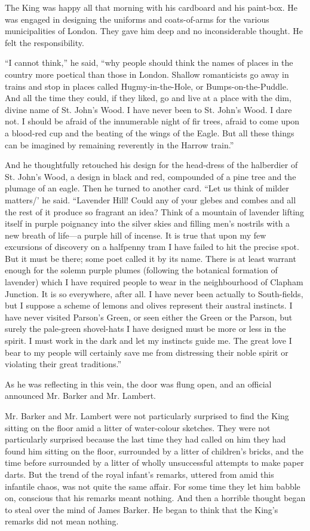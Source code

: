 \documentclass{book}
\begin{document}
The King was happy all that morning with his cardboard and his paint-box. He was engaged in designing the uniforms and coats-of-arms for the various municipalities of London. They gave him deep and no inconsiderable thought. He felt the responsibility.

“I cannot think,” he said, “why people should think the names of places in the country more poetical than those in London. Shallow romanticists go away in trains and stop in places called Hugmy-in-the-Hole, or Bumps-on-the-Puddle. And all the time they could, if they liked, go and live at a place with the dim, divine name of St. John’s Wood. I have never been to St. John’s Wood. I dare not. I should be afraid of the innumerable night of fir trees, afraid to come upon a blood-red cup and the beating of the wings of the Eagle. But all these things can be imagined by remaining reverently in the Harrow train.”

And he thoughtfully retouched his design for the head-dress of the halberdier of St. John’s Wood, a design in black and red, compounded of a pine tree and the plumage of an eagle. Then he turned to another card. “Let us think of milder matters/’ he said. “Lavender Hill! Could any of your glebes and combes and all the rest of it produce so fragrant an idea? Think of a mountain of lavender lifting itself in purple poignancy into the silver skies and filling men’s nostrils with a new breath of life—a purple hill of incense. It is true that upon my few excursions of discovery on a halfpenny tram I have failed to hit the precise spot. But it must be there; some poet called it by its name. There is at least warrant enough for the solemn purple plumes (following the botanical formation of lavender) which I have required people to wear in the neighbourhood of Clapham Junction. It is so everywhere, after all. I have never been actually to South-fields, but I suppose a scheme of lemons and olives represent their austral instincts. I have never visited Parson’s Green, or seen either the Green or the Parson, but surely the pale-green shovel-hats I have designed must be more or less in the spirit. I must work in the dark and let my instincts guide me. The great love I bear to my people will certainly save me from distressing their noble spirit or violating their great traditions.”

As he was reflecting in this vein, the door was flung open, and an official announced Mr. Barker and Mr. Lambert.

Mr. Barker and Mr. Lambert were not particularly surprised to find the King sitting on the floor amid a litter of water-colour sketches. They were not particularly surprised because the last time they had called on him they had found him sitting on the floor, surrounded by a litter of children’s bricks, and the time before surrounded by a litter of wholly unsuccessful attempts to make paper darts. But the trend of the royal infant’s remarks, uttered from amid this infantile chaos, was not quite the same affair. For some time they let him babble on, conscious that his remarks meant nothing. And then a horrible thought began to steal over the mind of James Barker. He began to think that the King’s remarks did not mean nothing.
\end{document}
